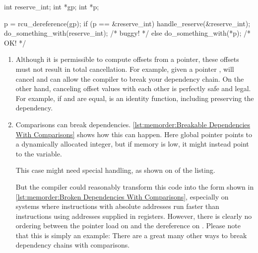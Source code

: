 \begin{listing}[tbp]
\begin{fcvlabel}
\begin{VerbatimL}[commandchars=\\\[\]]
int reserve_int;
int *gp;
int *p;

p = rcu_dereference(gp);	\lnlbl[deref1]
if (p == &reserve_int) {
	handle_reserve(&reserve_int);
	do_something_with(reserve_int); /* buggy! */ \lnlbl[deref2]
} else {
	do_something_with(*p); /* OK! */
}
\end{VerbatimL}
\end{fcvlabel}
\caption{Broken Dependencies With Comparisons}
\label{lst:memorder:Broken Dependencies With Comparisons}
\end{listing}

\begin{enumerate}
\item	Although it is permissible to compute offsets from a
	pointer, these offsets must not result in total cancellation.
	For example, given a  pointer ,
	 will cancel and can allow the compiler
	to break your dependency chain.
	On the other hand, canceling offset values with each other
	is perfectly safe and legal.
	For example, if  and  are equal, 
	is an identity function, including preserving the dependency.
\item	Comparisons can break dependencies.
	\cref{lst:memorder:Breakable Dependencies With Comparisons}
	shows how this can happen.
	Here global pointer  points to a dynamically allocated
	integer, but if memory is low, it might instead point to
	the  variable.
	\begin{fcvref}
	This  case might need special handling, as
	shown on  of the listing.
	\end{fcvref}
        \begin{fcvref}
	But the compiler could reasonably transform this code into
	the form shown in
	\cref{lst:memorder:Broken Dependencies With Comparisons},
	especially on systems where instructions with absolute
	addresses run faster than instructions using addresses
	supplied in registers.
	However, there is clearly no ordering between the pointer
	load on  and the dereference on .
	Please note that this is simply an example: There are a great
	many other ways to break dependency chains with comparisons.
	\end{fcvref}
\end{enumerate}

